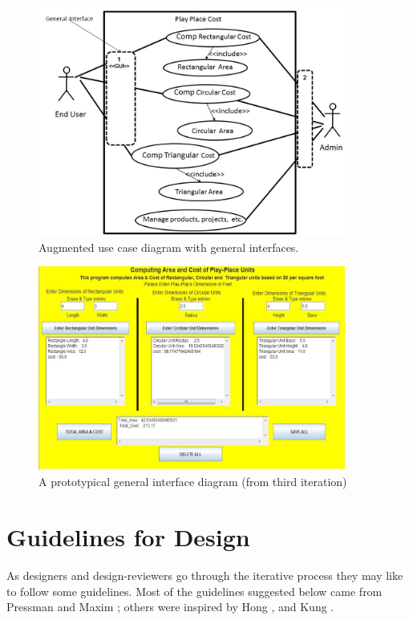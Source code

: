 \documentclass{article}
\begin{document}
\begin{figure}
    
 \centering
    \includegraphics[width=0.9\textwidth]{191_1.jpg}
  \caption{\label{fig:UseCasePlayPlace}Augmented use case diagram with general interfaces.}
 

\end{figure} 


\begin{figure}
    
 \centering
    \includegraphics[width=0.9\textwidth]{191_2.jpg}
   \caption{\label{fig:_GUIplayPlace}A prototypical general interface diagram (from third iteration)}

\end{figure} 

\section{Guidelines for Design}
As designers and design-reviewers go through the iterative process they may like to follow some guidelines. Most of the guidelines suggested below came from Pressman and Maxim \cite{pressman}; others were inspired by Hong \cite{hong}, and Kung \cite{kung}.       
\end{document}
